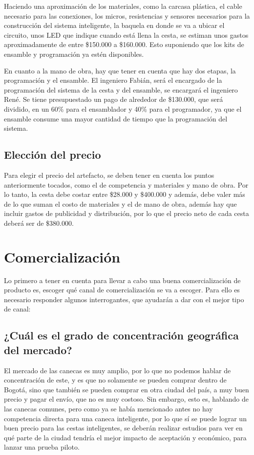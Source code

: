 \documentclass[letterpaper,12pt]{scrreprt}
\begin{document}
    Haciendo una aproximación de los materiales, como la carcasa plástica, el cable necesario para las conexiones, los micros, resistencias y sensores necesarios para la construcción del sistema inteligente, la baquela en donde se va a ubicar el circuito, unos LED que indique cuando está llena la cesta, se estiman unos gastos aproximadamente de entre \$150.000 a \$160.000. Esto suponiendo que los kits de ensamble y programación ya estén disponibles.

    En cuanto a la mano de obra, hay que tener en cuenta que hay dos etapas, la programación y el ensamble. El ingeniero Fabián, será el encargado de la programación del sistema de la cesta y del ensamble, se encargará el ingeniero René. Se tiene presupuestado un pago de alrededor de \$130.000, que será dividido, en un 60\% para el ensamblador y 40\% para el programador, ya que el ensamble consume una mayor cantidad de tiempo que la programación del sistema.

    \section{Elección del precio}
    Para elegir el precio del artefacto, se deben tener en cuenta los puntos anteriormente tocados, como el de competencia y materiales y mano de obra. Por lo tanto, la cesta debe costar entre \$28.000 y \$400.000 y además, debe valer más de lo que suman el costo de materiales y el de mano de obra, además hay que incluir gastos de publicidad y distribución, por lo que el precio neto de cada cesta deberá ser de \$380.000.

\chapter{Comercialización}
    Lo primero a tener en cuenta para llevar a cabo una buena comercialización de producto es, escoger qué canal de comercialización se va a escoger. Para ello es necesario responder algunos interrogantes, que ayudarán a dar con el mejor tipo de canal:

    \section{¿Cuál es el grado de concentración geográfica del mercado?}
    El mercado de las canecas es muy amplio, por lo que no podemos hablar de concentración de este, y es que no solamente se pueden comprar dentro de Bogotá, sino que también se pueden comprar en otra ciudad del país, a muy buen precio y pagar el envío, que no es muy costoso. Sin embargo, esto es, hablando de las canecas comunes, pero como ya se había mencionado antes no hay competencia directa para una caneca inteligente, por lo que sí se puede lograr un buen precio para las cestas inteligentes, se deberán realizar estudios para ver en qué parte de la ciudad tendría el mejor impacto de aceptación y económico, para lanzar una prueba piloto.
\end{document}
